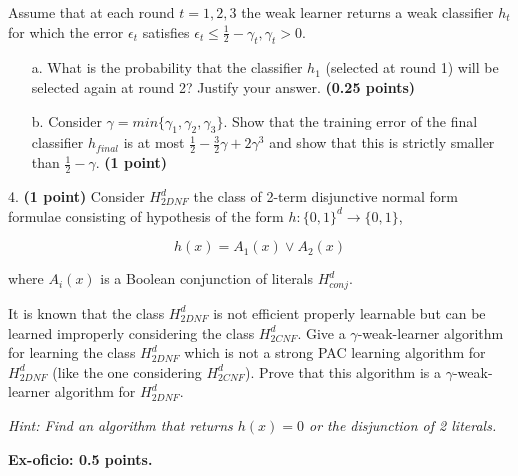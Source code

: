\documentclass{article}
\begin{document}
Assume that at each round $t = 1, 2, 3$ the weak learner returns a weak classifier $h_t$ for which the error $\epsilon_t$ satisfies $\epsilon_t \leq \frac{1}{2} - \gamma_t, \gamma_t > 0$. 
\begin{enumerate}
    \item[a.] What is the probability that the classifier $h_1$ (selected at round 1) will be selected again at round 2? Justify your answer. \textbf{(0.25 points)}
    \item[b.] Consider $\gamma = min\{\gamma_1, \gamma_2, \gamma_3\}$. Show that the training error of the final classifier $h_{final}$ is at most $\frac{1}{2} - \frac{3}{2}\gamma + 2\gamma^3$ and show that this is strictly smaller than $\frac{1}{2} - \gamma$. \textbf{(1 point)}
\end{enumerate}

4. \textbf{(1 point)} Consider $H_{2DNF}^{d}$ the class of 2-term disjunctive normal form formulae consisting of hypothesis of the form $h : \{0,1\}^{d} \rightarrow \{0,1\}$, 

$$h(x) = A_1(x) \lor A_2 (x)$$

where $A_i(x)$ is a Boolean conjunction of literals $H_{conj}^{d}$.

It is known that the class $H_{2DNF}^{d}$ is not efficient properly learnable but can be learned improperly considering the class $H_{2CNF}^{d}$. Give a $\gamma$-weak-learner algorithm for learning the class $H_{2DNF}^{d}$ which is not a strong PAC learning algorithm for $H_{2DNF}^{d}$ (like the one considering $H_{2CNF}^{d}$). Prove that this algorithm is a $\gamma$-weak-learner algorithm for $H_{2DNF}^{d}$.

\vspace{2mm}

\textit{Hint: Find an algorithm that returns $h(x)=0$ or the disjunction of 2 literals.}

\vspace{5mm}

\textbf{Ex-oficio: 0.5 points.}
\end{document}
